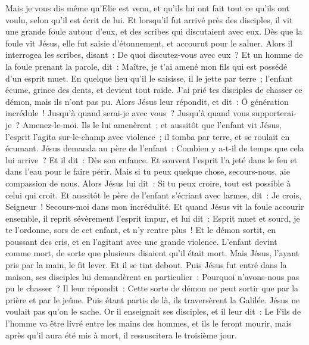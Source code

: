 \begin{multicols}{2}
Mais je vous dis même qu'Elie est venu, et qu'ils lui ont fait tout ce qu'ils ont voulu, selon qu'il est écrit de lui.
Et lorsqu'il fut arrivé près des disciples, il vit une grande foule autour d'eux, et des scribes qui discutaient avec eux.
Dès que la foule vit Jésus, elle fut saisie d'étonnement, et accourut pour le saluer.
Alors il interrogea les scribes, disant~: De quoi discutez-vous avec eux~?
Et un homme de la foule prenant la parole, dit~: Maître, je t'ai amené mon fils qui est possédé d'un esprit muet.
En quelque lieu qu'il le saisisse, il le jette par terre~; l'enfant écume, grince des dents, et devient tout raide. J'ai prié tes disciples de chasser ce démon, mais ils n'ont pas pu.
Alors Jésus leur répondit, et dit~: Ô génération incrédule~! Jusqu'à quand serai-je avec vous~? Jusqu'à quand vous supporterai-je~? Amenez-le-moi. Ils le lui amenèrent~;
et aussitôt que l'enfant vit Jésus, l'esprit l'agita sur-le-champ avec violence~; il tomba par terre, et se roulait en écumant.
Jésus demanda au père de l'enfant~: Combien y a-t-il de temps que cela lui arrive~? Et il dit~: Dès son enfance.
Et souvent l'esprit l'a jeté dans le feu et dans l'eau pour le faire périr. Mais si tu peux quelque chose, secours-nous, aie compassion de nous.
Alors Jésus lui dit~: Si tu peux croire, tout est possible à celui qui croit.
Et aussitôt le père de l'enfant s'écriant avec larmes, dit~: Je crois, Seigneur~! Secours-moi dans mon incrédulité.
Et quand Jésus vit la foule accourir ensemble, il reprit sévèrement l'esprit impur, et lui dit~: Esprit muet et sourd, je te l'ordonne, sors de cet enfant, et n'y rentre plus~!
Et le démon sortit, en poussant des cris, et en l'agitant avec une grande violence. L'enfant devint comme mort, de sorte que plusieurs disaient qu'il était mort.
Mais Jésus, l'ayant pris par la main, le fit lever. Et il se tint debout.
Puis Jésus fut entré dans la maison, ses disciples lui demandèrent en particulier~: Pourquoi n'avons-nous pas pu le chasser~?
Il leur répondit~: Cette sorte de démon ne peut sortir que par la prière et par le jeûne.
Puis étant partis de là, ils traversèrent la Galilée. Jésus ne voulait pas qu'on le sache.
Or il enseignait ses disciples, et il leur dit~: Le Fils de l'homme va être livré entre les mains des hommes, et ils le feront mourir, mais après qu'il aura été mis à mort, il ressuscitera le troisième jour.

\end{multicols}
